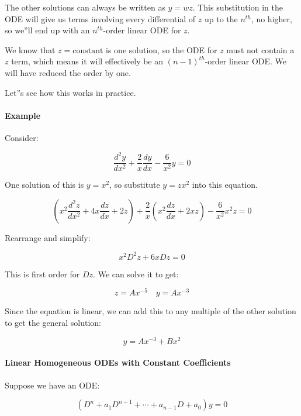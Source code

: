 The other solutions can always be written as $y = wz$. This substitution in the ODE will give us terms involving every differential of $z$ up to the $n^{th}$, no higher, so we''ll end up with an $n^{th}$-order linear ODE for $z$.



We know that $z = \text{constant}$ is one solution, so the ODE for $z$ must not contain a $z$ term, which means it will effectively be an $(n-1)^{th}$-order linear ODE. We will have reduced the order by one.



Let''s see how this works in practice.



\paragraph{Example}

Consider:

$$\frac{d^2 y}{dx^2} + \frac{2}{x} \frac{dy}{dx} - \frac{6}{x^2} y = 0$$



One solution of this is $y = x^2$, so substitute $y = zx^2$ into this equation.



$$\left( x^2\frac{d^2 z}{dx^2} + 4x\frac{dz}{dx} + 2z\right) + \frac{2}{x} \left( x^2\frac{dz}{dx} + 2xz \right) - \frac{6}{x^2}x^2 z = 0$$



Rearrange and simplify:

$$x^2 D^2 z + 6xD z = 0$$ 

This is first order for $D z$. We can solve it to get:

$$z = A x^{-5} \quad y = A x^{-3}$$



Since the equation is linear, we can add this to any multiple of the other solution to get the general solution:



$$y = A x^{-3} + B x^2$$



\paragraph{Linear Homogeneous ODEs with Constant Coefficients}

Suppose we have an ODE:

$$(D^n + a_1 D^{n-1} + \cdots + a_{n-1} D + a_0) y = 0$$

